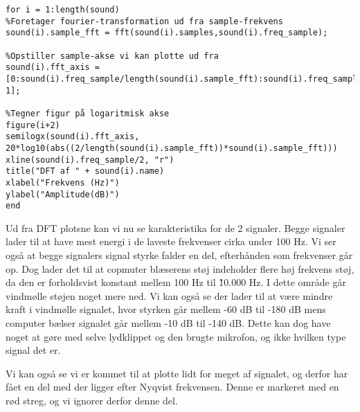 \documentclass[../main.tex]{subfiles}
\begin{document}
\begin{lstlisting}[caption={Kode til at plotte DFT for vindmølle og computer blæser lyde}, label={lst:wind_dft}]
for i = 1:length(sound)
%Foretager fourier-transformation ud fra sample-frekvens
sound(i).sample_fft = fft(sound(i).samples,sound(i).freq_sample);

%Opstiller sample-akse vi kan plotte ud fra
sound(i).fft_axis = [0:sound(i).freq_sample/length(sound(i).sample_fft):sound(i).freq_sample-1];

%Tegner figur på logaritmisk akse
figure(i+2)
semilogx(sound(i).fft_axis, 20*log10(abs((2/length(sound(i).sample_fft))*sound(i).sample_fft)))
xline(sound(i).freq_sample/2, "r")
title("DFT af " + sound(i).name)
xlabel("Frekvens (Hz)")
ylabel("Amplitude(dB)")
end
\end{lstlisting}



Ud fra DFT plotsne kan vi nu se karakteristika for de 2 signaler. Begge signaler lader til at have mest energi i de laveste frekvenser cirka under 100 Hz. Vi ser også at begge signalers signal styrke falder en del, efterhånden som frekvenser går op. Dog lader det til at copmuter blæserens støj indeholder flere høj frekvens støj, da den er forholdsvist konstant mellem 100 Hz til \~10.000 Hz. I dette område går vindmølle støjen noget mere ned. Vi kan også se der lader til at være mindre kraft i vindmølle signalet, hvor styrken går mellem -60 dB til -180 dB mens computer bælser signalet går mellem -10 dB til -140 dB. Dette kan dog have noget at gøre med selve lydklippet og den brugte mikrofon, og ikke hvilken type signal det er.

Vi kan også se vi er kommet til at plotte lidt for meget af signalet, og derfor har fået en del med der ligger efter Nyqvist frekvensen. Denne er markeret med en rød streg, og vi ignorer derfor denne del.
\end{document}
